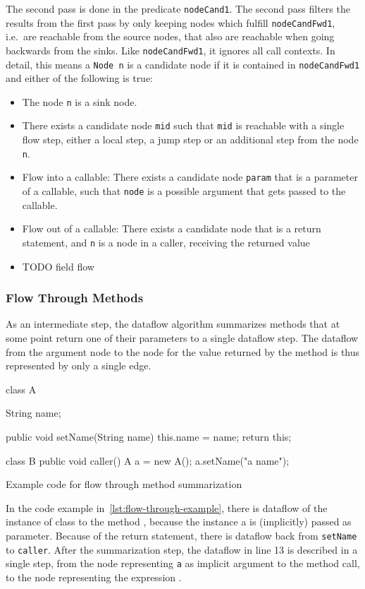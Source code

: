 The second pass is done in the predicate \texttt{nodeCand1}.
The second pass filters the results from the first pass by only keeping nodes
which fulfill \texttt{nodeCandFwd1}, i.e.\ are reachable from the source nodes,
that also are reachable when going backwards from the sinks.
Like \texttt{nodeCandFwd1}, it ignores all call contexts.
In detail, this means a \texttt{Node n} is a candidate node if it is contained in 
\texttt{nodeCandFwd1} and either of the following is true:
\begin{itemize}
    \item The node \texttt{n} is a sink node.
    \item There exists a candidate node \texttt{mid} such that \texttt{mid} is reachable with a single flow step,
    either a local step, a jump step or an additional step from the node \texttt{n}.
    \item Flow into a callable:
    There exists a candidate node \texttt{param} that is a parameter of a callable,
    such that \texttt{node} is a possible argument that gets passed to the callable.
    \item Flow out of a callable:
    There exists a candidate node that is a return statement, and \texttt{n} is 
    a node in a caller, receiving the returned value
    \item TODO field flow
\end{itemize}

\subsubsection*{Flow Through Methods}
As an intermediate step, the dataflow algorithm summarizes methods that at some point 
return one of their parameters to a single dataflow step.
The dataflow from the argument node to the node for the value returned by
the method is thus represented by only a single edge.
\begin{listing}[H]
    \begin{javacode}
        class A {
            String name;
        
            public void setName(String name) {
                this.name = name;
                return this;
            }
        }
    
        class B {
            public void caller() {
                A a = new A();
                a.setName("a name");
            }
        }
    \end{javacode}
    \caption{Example code for flow through method summarization}    
    \label{lst:flow-through-example}
\end{listing}
In the code example in~\autoref{lst:flow-through-example}, there is dataflow of the instance
of class  to the method , because the instance a 
is (implicitly) passed as  parameter.
Because of the return statement, there is dataflow back from \texttt{setName} to
\texttt{caller}.
After the summarization step, the dataflow in line 13 is described in a single step,
from the node representing \texttt{a} as implicit argument to the method call, to the node 
representing the expression .

